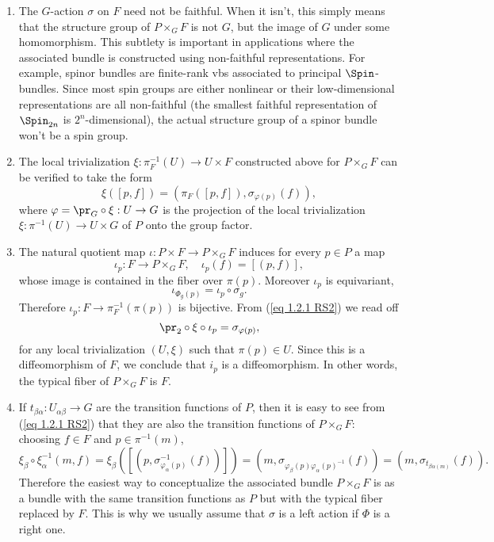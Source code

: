 \begin{rem}\label{rem 1.2.3 RS2}
    \begin{enumerate}
        \item The $G$-action $\sigma$ on $F$ need not be faithful. When it isn't, this simply means that the structure group of $P\times_G F$ is not $G$, but the image of $G$ under some homomorphism. This subtlety is important in applications where the associated bundle is constructed using non-faithful representations. For example, spinor bundles are finite-rank \glspl{vb} associated to principal $\Spin$-bundles. Since most spin groups are either nonlinear or their low-dimensional representations are all non-faithful (the smallest faithful representation of $\Spin_{2n}$ is $2^n$-dimensional), the actual structure group of a spinor bundle won't be a spin group.
        \item The local trivialization $\xi:\pi_F^{-1}(U)\to U\times F$ constructed above for $P\times_G F$ can be verified to take the form
        \[\xi([p,f])=(\pi_F([p,f]),\sigma_{\varphi(p)}(f)),\label{eq 1.2.1 RS2}\]
        where $\varphi=\pr_G\circ \xi:U\to G$ is the projection of the local trivialization $\xi:\pi^{-1}(U)\to U\times G$ of $P$ onto the group factor.
        \item The natural quotient map $\iota:P\times F\to P\times_G F$ induces for every $p\in P$ a map 
        \[\iota_p:F\to P\times_G F,\quad  \iota_p(f)=[(p,f)],\label{eq 1.2.2 RS2 def iotap}\]
        whose image is contained in the fiber over $\pi(p)$.  Moreover $\iota_p$ is equivariant,
        \[\iota_{\Phi_g(p)}=\iota_p\circ \sigma_g.\label{eq 1.2.3 RS2}\]
        Therefore $\iota_p:F\to \pi_F^{-1}(\pi(p))$ is bijective.  From (\ref{eq 1.2.1 RS2}) we read off
        \[\pr_2\circ\xi\circ \iota_p=\sigma_{\varphi(p)},\]
        for any local trivialization $(U,\xi)$ such that $\pi(p)\in U$. Since this is a diffeomorphism of $F$, we conclude that $i_p$ is a diffeomorphism. In other words, the typical fiber of $P\times_G F$ is $F$.
        \item If $t_{\beta\alpha}:U_{\alpha\beta}\to G$ are the transition functions of $P$, then it is easy to see from (\ref{eq 1.2.1 RS2}) that they are also the transition functions of $P\times_G F$: choosing $f\in F$ and $p\in \pi^{-1}(m)$,
        \[\xi_\beta\circ\xi_{\alpha}^{-1}(m,f)=\xi_\beta([(p,\sigma_{\varphi_\alpha(p)}^{-1}(f))])=(m,\sigma_{\varphi_\beta(p)\varphi_\alpha(p)^{-1}}(f))=(m,\sigma_{t_{\beta\alpha(m)}}(f)).\]
        Therefore the easiest way to conceptualize the associated bundle $P\times_G F$ is as a bundle with the same transition functions as $P$ but with the typical fiber replaced by $F$. This is why we usually assume that $\sigma$ is a left action if $\Phi$ is a right one.
    \end{enumerate}
\end{rem}

